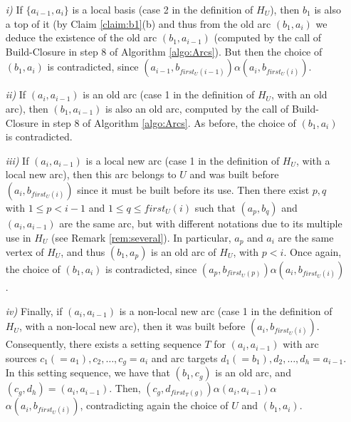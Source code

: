 \documentclass{article}
\begin{document}
\begin{itemize}
\item[{\sl i)}] If $\{a_{i-1},a_i\}$ is a local basis (case 2 in the definition of $H_U$), 
then $b_1$ is also a top of it (by Claim \ref{claim:b1}(b)
and thus from the old arc $(b_1,a_{i})$ we deduce the existence of the old arc $(b_1,a_{i-1})$
(computed by the call of Build-Closure in step 8 of Algorithm \ref{algo:Arcs}). But then
the choice of $(b_1,a_i)$ is contradicted, since $(a_{i-1},b_{first_U(i-1)})\alpha (a_i,b_{first_U(i)})$.

\item[{\sl ii)}] If $(a_i,a_{i-1})$ is an old arc (case 1 in the definition of $H_U$, with an old arc), 
then $(b_1,a_{i-1})$ is also an old arc, computed by the call of Build-Closure in step 8 of Algorithm \ref{algo:Arcs}. As before, the choice of $(b_1,a_i)$ is contradicted.

\item[{\sl iii)}] If $(a_i,a_{i-1})$ is a local new arc (case 1 in the definition of $H_U$, with a local new 
arc), then this arc belongs to $U$ and was built before $(a_i, b_{first_U(i)})$ since
it must be built before its use. Then there exist $p,q$ with $1\leq p< i-1$ and 
$1\leq q\leq first_U(i)$ such that $(a_p,b_q)$ and $(a_i, a_{i-1})$ are the same arc,
but with different notations due to its multiple use in $H_U$ (see Remark  
\ref{rem:several}). In particular, $a_p$ and $a_i$ are the same vertex of $H_U$, and
thus $(b_1,a_p)$ is an old arc of $H_U$, with $p<i$. Once again, the choice of
$(b_1,a_i)$ is contradicted, since $(a_{p},b_{first_U(p)})\alpha (a_i,b_{first_U(i)})$.

\item[{\sl iv)}]  Finally, if $(a_i,a_{i-1})$ is a non-local new  arc (case 1 in the definition of $H_U$, with a non-local new arc), 
then it was built before $(a_i, b_{first_U(i)})$. Consequently, 
there exists a setting sequence $T$ for $(a_i,a_{i-1})$
with arc sources $c_1(=a_1), c_2, \ldots, c_g=a_i$ and arc targets 
$d_1(=b_1), d_2, \ldots, d_h=a_{i-1}$. In this setting sequence, we have that 
$(b_1,c_g)$ is an old arc, and $(c_g,d_h)=(a_i,a_{i-1})$. Then, 
$(c_g, d_{first_T(g)})\alpha (a_i,a_{i-1})\alpha$ $\alpha(a_i, b_{first_U(i)})$,
contradicting again the choice of $U$ and $(b_1,a_i)$.
\end{itemize}
\end{document}
